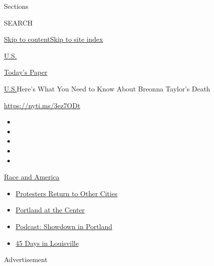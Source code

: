 Sections

SEARCH

\protect\hyperlink{site-content}{Skip to
content}\protect\hyperlink{site-index}{Skip to site index}

\href{https://www.nytimes.com/section/us}{U.S.}

\href{https://myaccount.nytimes.com/auth/login?response_type=cookie\&client_id=vi}{}

\href{https://www.nytimes.com/section/todayspaper}{Today's Paper}

\href{/section/us}{U.S.}\textbar{}Here's What You Need to Know About
Breonna Taylor's Death

\url{https://nyti.ms/3ez7ODt}

\begin{itemize}
\item
\item
\item
\item
\item
\end{itemize}

\href{https://www.nytimes.com/news-event/george-floyd-protests-minneapolis-new-york-los-angeles?action=click\&pgtype=Article\&state=default\&region=TOP_BANNER\&context=storylines_menu}{Race
and America}

\begin{itemize}
\tightlist
\item
  \href{https://www.nytimes.com/2020/07/26/us/protests-portland-seattle-trump.html?action=click\&pgtype=Article\&state=default\&region=TOP_BANNER\&context=storylines_menu}{Protesters
  Return to Other Cities}
\item
  \href{https://www.nytimes.com/2020/07/24/us/portland-oregon-protests-white-race.html?action=click\&pgtype=Article\&state=default\&region=TOP_BANNER\&context=storylines_menu}{Portland
  at the Center}
\item
  \href{https://www.nytimes.com/2020/07/23/podcasts/the-daily/portland-protests.html?action=click\&pgtype=Article\&state=default\&region=TOP_BANNER\&context=storylines_menu}{Podcast:
  Showdown in Portland}
\item
  \href{https://www.nytimes.com/interactive/2020/07/16/us/black-lives-matter-protests-louisville-breonna-taylor.html?action=click\&pgtype=Article\&state=default\&region=TOP_BANNER\&context=storylines_menu}{45
  Days in Louisville}
\end{itemize}

Advertisement

